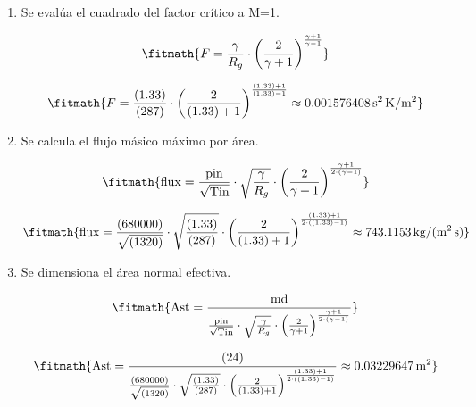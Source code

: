 \begin{enumerate}

\item Se evalúa el cuadrado del factor crítico a M=1.

\[\fitmath{F=\frac{\gamma}{R_g}\cdot {\left(\frac{2}{\gamma+1}\right)}^{\frac{\gamma+1}{\gamma-1}}}\]

\[\fitmath{F=\frac{(1.33)}{(287)}\cdot {\left(\frac{2}{(1.33)+1}\right)}^{\frac{(1.33)+1}{(1.33)-1}}\approx 0.001576408\,\mathrm{s^{2}\,K/m^{2}}}\]

\item Se calcula el flujo másico máximo por área.

\[\fitmath{\mathrm{flux}=\frac{\mathrm{pin}}{\sqrt{\mathrm{Tin}}}\cdot \sqrt{\frac{\gamma}{R_g}}\cdot {\left(\frac{2}{\gamma+1}\right)}^{\frac{\gamma+1}{2\cdot \left(\gamma-1\right)}}}\]

\[\fitmath{\mathrm{flux}=\frac{(680000)}{\sqrt{(1320)}}\cdot \sqrt{\frac{(1.33)}{(287)}}\cdot {\left(\frac{2}{(1.33)+1}\right)}^{\frac{(1.33)+1}{2\cdot \left((1.33)-1\right)}}\approx 743.1153\,\mathrm{kg/(m^{2}\,s)}}\]

\item Se dimensiona el área normal efectiva.

\[\fitmath{\mathrm{Ast}=\frac{\mathrm{md}}{\frac{\mathrm{pin}}{\sqrt{\mathrm{Tin}}}\cdot \sqrt{\frac{\gamma}{R_g}}\cdot {\left(\frac{2}{\gamma+1}\right)}^{\frac{\gamma+1}{2\cdot \left(\gamma-1\right)}}}}\]

\[\fitmath{\mathrm{Ast}=\frac{(24)}{\frac{(680000)}{\sqrt{(1320)}}\cdot \sqrt{\frac{(1.33)}{(287)}}\cdot {\left(\frac{2}{(1.33)+1}\right)}^{\frac{(1.33)+1}{2\cdot \left((1.33)-1\right)}}}\approx 0.03229647\,\mathrm{m^{2}}}\]

\end{enumerate}
